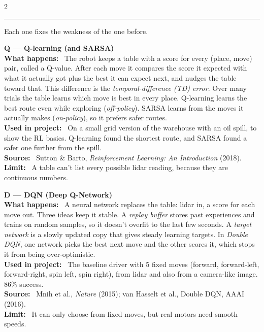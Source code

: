 \documentclass[10pt,a4paper]{extarticle}
\newcommand{\hd}[1]{\par\vspace{6pt}{\color{acc}\large\bfseries #1}\par\vspace{2pt}\hrule\vspace{4pt}}
\newcommand{\lbl}[1]{\textbf{#1:}~}
\begin{document}
\begin{multicols}{2}
\hd{3. The algorithms: ``Q $\to$ D $\to$ P $\to$ S''}
Each one fixes the weakness of the one before.

\textbf{Q --- Q-learning (and SARSA)}\\
\lbl{What happens} The robot keeps a table with a score for every (place, move) pair, called a Q-value. After
each move it compares the score it expected with what it actually got plus the best it can expect next, and
nudges the table toward that. This difference is the \emph{temporal-difference (TD) error}. Over many trials the
table learns which move is best in every place. Q-learning learns the best route even while exploring
(\emph{off-policy}). SARSA learns from the moves it actually makes (\emph{on-policy}), so it prefers safer routes.\\
\lbl{Used in project} On a small grid version of the warehouse with an oil spill, to show the RL basics. Q-learning
found the shortest route, and SARSA found a safer one further from the spill.\\
\lbl{Source} Sutton \& Barto, \emph{Reinforcement Learning: An Introduction} (2018).\\
\lbl{Limit} A table can't list every possible lidar reading, because they are continuous numbers.

\textbf{D --- DQN (Deep Q-Network)}\\
\lbl{What happens} A neural network replaces the table: lidar in, a score for each move out. Three ideas keep it
stable. A \emph{replay buffer} stores past experiences and trains on random samples, so it doesn't overfit to the
last few seconds. A \emph{target network} is a slowly updated copy that gives steady learning targets. In
\emph{Double DQN}, one network picks the best next move and the other scores it, which stops it from being
over-optimistic.\\
\lbl{Used in project} The baseline driver with 5 fixed moves (forward, forward-left, forward-right, spin left, spin
right), from lidar and also from a camera-like image. 86\% success.\\
\lbl{Source} Mnih et al., \emph{Nature} (2015); van Hasselt et al., Double DQN, AAAI (2016).\\
\lbl{Limit} It can only choose from fixed moves, but real motors need smooth speeds.


\end{multicols}
\end{document}
